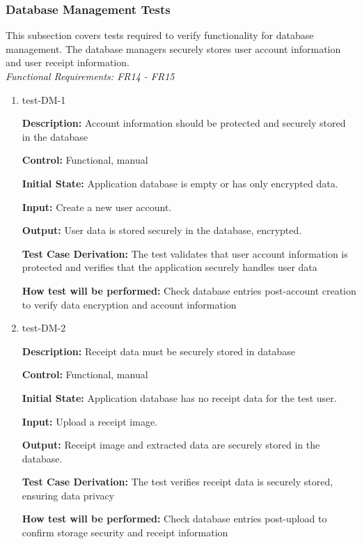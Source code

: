 \documentclass[12pt, titlepage]{article}
\begin{document}
\subsubsection{Database Management Tests}

This subsection covers tests required to verify functionality for database management. The database managers securely stores user account information and user receipt information.\\
\textit{Functional Requirements: FR14 - FR15}

\begin{enumerate}
\item{test-DM-1\\}

\textbf{Description:} Account information should be protected and securely stored in the database

\textbf{Control:} Functional, manual

\textbf{Initial State:} Application database is empty or has only encrypted data.

\textbf{Input:} Create a new user account.

\textbf{Output:} User data is stored securely in the database, encrypted.

\textbf{Test Case Derivation:} The test validates that user account information is protected and verifies that the application securely handles user data

\textbf{How test will be performed:} Check database entries post-account creation to verify data encryption and account information

\item{test-DM-2\\}

\textbf{Description:} Receipt data must be securely stored in database

\textbf{Control:} Functional, manual

\textbf{Initial State:} Application database has no receipt data for the test user.

\textbf{Input:} Upload a receipt image.

\textbf{Output:} Receipt image and extracted data are securely stored in the database.

\textbf{Test Case Derivation:} The test verifies receipt data is securely stored, ensuring data privacy

\textbf{How test will be performed:} Check database entries post-upload to confirm storage security and receipt information
\end{enumerate}
\end{document}
